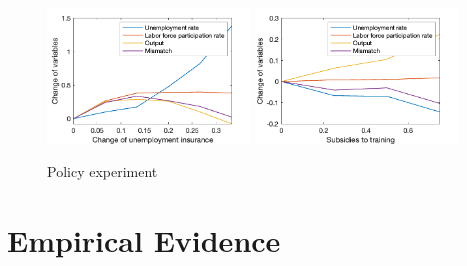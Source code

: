 \documentclass[12pt]{article}
\newcommand{\1}{\mathbb{1}}
\begin{document}
\begin{figure}[h!]
\centering
\includegraphics[width=0.48\textwidth]{Simulation1}
\includegraphics[width=0.48\textwidth]{Simulation2}
\caption{Policy experiment}
\label{Simulation}
\end{figure}

\section{Empirical Evidence}
\end{document}
